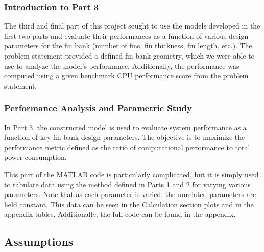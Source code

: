 \documentclass[12pt, titlepage]{article}
\begin{document}
\subsubsection{Introduction to Part 3}

The third and final part of this project sought to use the models developed in the first two parts and evaluate their performances as a function of various design parameters for the fin bank (number of fins, fin thickness, fin length, etc.). The problem statement provided a defined fin bank geometry, which we were able to use to analyze the model's performance.  Additionally, the performance was computed using a given benchmark CPU performance score from the problem statement.

\subsubsection{Performance Analysis and Parametric Study}

In Part 3, the constructed model is used to evaluate system performance as a function of key fin bank design parameters. The objective is to maximize the performance metric defined as the ratio of computational performance to total power consumption.

This part of the MATLAB code is particularly complicated, but it is simply used to tabulate data using the method defined in Parts 1 and 2 for varying various parameters. Note that as each parameter is varied, the unrelated parameters are held constant. This data can be seen in the Calculation section plots and in the appendix tables. Additionally, the full code can be found in the appendix.

\subsection{Assumptions}
\end{document}
